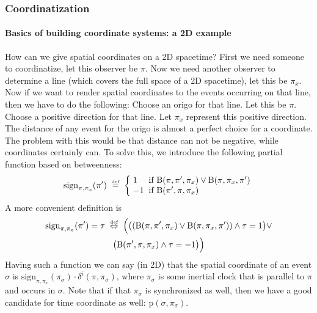 \documentclass[xcolor=x11names]{beamer}
\newcommand{\Between}{\mathrm{B}}
\newcommand{\defegy}[1][.1]{\hspace{#1cm}\overset{\textup{\tiny def}}{=}\hspace{#1cm}}
\newcommand{\defekv}[1][.1]{\hspace{#1cm}\overset{\textup{\tiny def}}{ \Leftrightarrow }\hspace{#1cm}}
\newcommand{\Pointsf}{\mathrm{p}}
\newenvironment{tomb}[2][.1]{\arraycolsep=#1cm\begin{array}{#2}}{\end{array}}
\begin{document}
\begin{frame}[t]
\frametitle{Coordinatization}
\framesubtitle{Basics of building coordinate systems: a 2D example}
\scriptsize
How can we give spatial coordinates on a 2D spacetime?
First we need someone to coordinatize, let this observer be $\pi$. Now we need another observer to determine a line (which covers the full space of a 2D spacetime), let this be $\pi_x$.
Now if we want to render spatial coordinates to the events occurring on that line, then we have to do the following:
Choose an origo for that line. Let this be $\pi$.
Choose a positive direction for that line. Let $\pi_x$ represent this positive direction.
The distance of any event for the origo is almost a perfect choice for a coordinate. The problem with this would be that distance can not be negative, while coordinates certainly can. To solve this, we introduce the following partial function based on betweenness:
\vspace{-1ex}
\[\mathrm{sign}_{\pi, \pi_x}(\pi') \defegy
\left\{\begin{tomb}{ll}
   1 & \textup{if } \Between(\pi, \pi', \pi_x) \lor \Between(\pi, \pi_x, \pi')
\\ -1 & \textup{if } \Between(\pi', \pi, \pi_x)
\end{tomb}\right.\]
\vspace{-1ex}
A more convenient definition is
\vspace{-1ex}
\begin{multline*}
\mathrm{sign}_{\pi, \pi_x}(\pi') =\tau\defekv
\Big(\big((\Between(\pi, \pi', \pi_x) \lor \Between(\pi, \pi_x, \pi')) \land \tau = 1 \big)\lor
\\ \big(\Between(\pi', \pi, \pi_x) \land \tau = -1\big)\Big)
\end{multline*}
Having such a function we can say (in 2D) that the spatial coordinate of an event $\sigma$ is $\mathrm{sign}_{\pi, \pi_x}(\pi_\sigma)\cdot \delta^i(\pi,\pi_\sigma)$, where $\pi_\sigma$ is some inertial clock that is parallel to $\pi$ and occurs in $\sigma$. Note that if that $\pi_\sigma$ is synchronized as well, then we have a good candidate for time coordinate as well: $\Pointsf (\sigma, \pi_\sigma)$.

\end{frame}
\end{document}
